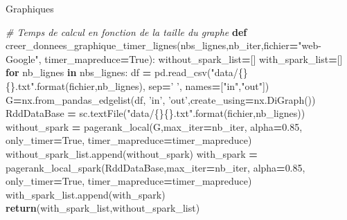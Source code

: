\documentclass[10pt,a4paper]{article}
\newenvironment{Shaded}{\begin{snugshade}}{\end{snugshade}}
\newcommand{\BuiltInTok}[1]{#1}
\newcommand{\CommentTok}[1]{\textcolor[rgb]{0.56,0.35,0.01}{\textit{#1}}}
\newcommand{\ControlFlowTok}[1]{\textcolor[rgb]{0.13,0.29,0.53}{\textbf{#1}}}
\newcommand{\FloatTok}[1]{\textcolor[rgb]{0.00,0.00,0.81}{#1}}
\newcommand{\KeywordTok}[1]{\textcolor[rgb]{0.13,0.29,0.53}{\textbf{#1}}}
\newcommand{\NormalTok}[1]{#1}
\newcommand{\OperatorTok}[1]{\textcolor[rgb]{0.81,0.36,0.00}{\textbf{#1}}}
\newcommand{\SpecialCharTok}[1]{\textcolor[rgb]{0.00,0.00,0.00}{#1}}
\newcommand{\StringTok}[1]{\textcolor[rgb]{0.31,0.60,0.02}{#1}}
\newcommand{\VariableTok}[1]{\textcolor[rgb]{0.00,0.00,0.00}{#1}}
\theoremstyle{break}
\begin{document}
Graphiques

\begin{Shaded}
\begin{Highlighting}[]
\CommentTok{# Temps de calcul en fonction de la taille du graphe}
\KeywordTok{def}\NormalTok{ creer_donnees_graphique_timer_lignes(nbs_lignes,nb_iter,fichier}\OperatorTok{=}\StringTok{"web-Google"}\NormalTok{,}
\NormalTok{                                         timer_mapreduce}\OperatorTok{=}\VariableTok{True}\NormalTok{):}
\NormalTok{    without_spark_list}\OperatorTok{=}\NormalTok{[]}
\NormalTok{    with_spark_list}\OperatorTok{=}\NormalTok{[]}
    \ControlFlowTok{for}\NormalTok{ nb_lignes }\KeywordTok{in}\NormalTok{ nbs_lignes: }
\NormalTok{        df }\OperatorTok{=}\NormalTok{ pd.read_csv(}\StringTok{"data/}\SpecialCharTok{\{\}\{\}}\StringTok{.txt"}\NormalTok{.}\BuiltInTok{format}\NormalTok{(fichier,nb_lignes),}
\NormalTok{                     sep}\OperatorTok{=}\StringTok{' '}\NormalTok{, names}\OperatorTok{=}\NormalTok{[}\StringTok{"in"}\NormalTok{,}\StringTok{"out"}\NormalTok{])}
\NormalTok{        G}\OperatorTok{=}\NormalTok{nx.from_pandas_edgelist(df, }\StringTok{'in'}\NormalTok{, }\StringTok{'out'}\NormalTok{,create_using}\OperatorTok{=}\NormalTok{nx.DiGraph())}
\NormalTok{        RddDataBase }\OperatorTok{=}\NormalTok{ sc.textFile(}\StringTok{"data/}\SpecialCharTok{\{\}\{\}}\StringTok{.txt"}\NormalTok{.}\BuiltInTok{format}\NormalTok{(fichier,nb_lignes))}
\NormalTok{        without_spark }\OperatorTok{=}\NormalTok{ pagerank_local(G,max_iter}\OperatorTok{=}\NormalTok{nb_iter,}
\NormalTok{                                            alpha}\OperatorTok{=}\FloatTok{0.85}\NormalTok{, only_timer}\OperatorTok{=}\VariableTok{True}\NormalTok{,}
\NormalTok{                                       timer_mapreduce}\OperatorTok{=}\NormalTok{timer_mapreduce)}
\NormalTok{        without_spark_list.append(without_spark)}
\NormalTok{        with_spark }\OperatorTok{=}\NormalTok{ pagerank_local_spark(RddDataBase,max_iter}\OperatorTok{=}\NormalTok{nb_iter,}
\NormalTok{                                               alpha}\OperatorTok{=}\FloatTok{0.85}\NormalTok{, only_timer}\OperatorTok{=}\VariableTok{True}\NormalTok{,}
\NormalTok{                                       timer_mapreduce}\OperatorTok{=}\NormalTok{timer_mapreduce)}
\NormalTok{        with_spark_list.append(with_spark)}
    \ControlFlowTok{return}\NormalTok{(with_spark_list,without_spark_list)}


\end{Highlighting}
\end{Shaded}
\end{document}
